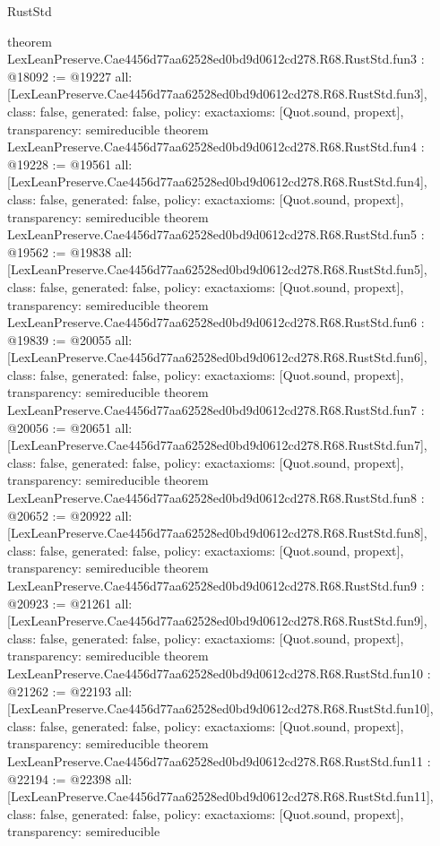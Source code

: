 \begin{lexlean}{RustStd}
\begin{coremodule}
{}
theorem LexLeanPreserve.Cae4456d77aa62528ed0bd9d0612cd278.R68.RustStd.fun3 : @18092 := @19227 {
  all: [LexLeanPreserve.Cae4456d77aa62528ed0bd9d0612cd278.R68.RustStd.fun3],
  class: false,
  generated: false,
  policy: exact{axioms: [Quot.sound, propext]},
  transparency: semireducible
}
theorem LexLeanPreserve.Cae4456d77aa62528ed0bd9d0612cd278.R68.RustStd.fun4 : @19228 := @19561 {
  all: [LexLeanPreserve.Cae4456d77aa62528ed0bd9d0612cd278.R68.RustStd.fun4],
  class: false,
  generated: false,
  policy: exact{axioms: [Quot.sound, propext]},
  transparency: semireducible
}
theorem LexLeanPreserve.Cae4456d77aa62528ed0bd9d0612cd278.R68.RustStd.fun5 : @19562 := @19838 {
  all: [LexLeanPreserve.Cae4456d77aa62528ed0bd9d0612cd278.R68.RustStd.fun5],
  class: false,
  generated: false,
  policy: exact{axioms: [Quot.sound, propext]},
  transparency: semireducible
}
theorem LexLeanPreserve.Cae4456d77aa62528ed0bd9d0612cd278.R68.RustStd.fun6 : @19839 := @20055 {
  all: [LexLeanPreserve.Cae4456d77aa62528ed0bd9d0612cd278.R68.RustStd.fun6],
  class: false,
  generated: false,
  policy: exact{axioms: [Quot.sound, propext]},
  transparency: semireducible
}
theorem LexLeanPreserve.Cae4456d77aa62528ed0bd9d0612cd278.R68.RustStd.fun7 : @20056 := @20651 {
  all: [LexLeanPreserve.Cae4456d77aa62528ed0bd9d0612cd278.R68.RustStd.fun7],
  class: false,
  generated: false,
  policy: exact{axioms: [Quot.sound, propext]},
  transparency: semireducible
}
theorem LexLeanPreserve.Cae4456d77aa62528ed0bd9d0612cd278.R68.RustStd.fun8 : @20652 := @20922 {
  all: [LexLeanPreserve.Cae4456d77aa62528ed0bd9d0612cd278.R68.RustStd.fun8],
  class: false,
  generated: false,
  policy: exact{axioms: [Quot.sound, propext]},
  transparency: semireducible
}
theorem LexLeanPreserve.Cae4456d77aa62528ed0bd9d0612cd278.R68.RustStd.fun9 : @20923 := @21261 {
  all: [LexLeanPreserve.Cae4456d77aa62528ed0bd9d0612cd278.R68.RustStd.fun9],
  class: false,
  generated: false,
  policy: exact{axioms: [Quot.sound, propext]},
  transparency: semireducible
}
theorem LexLeanPreserve.Cae4456d77aa62528ed0bd9d0612cd278.R68.RustStd.fun10 : @21262 := @22193 {
  all: [LexLeanPreserve.Cae4456d77aa62528ed0bd9d0612cd278.R68.RustStd.fun10],
  class: false,
  generated: false,
  policy: exact{axioms: [Quot.sound, propext]},
  transparency: semireducible
}
theorem LexLeanPreserve.Cae4456d77aa62528ed0bd9d0612cd278.R68.RustStd.fun11 : @22194 := @22398 {
  all: [LexLeanPreserve.Cae4456d77aa62528ed0bd9d0612cd278.R68.RustStd.fun11],
  class: false,
  generated: false,
  policy: exact{axioms: [Quot.sound, propext]},
  transparency: semireducible
}
\end{coremodule}
\end{lexlean}
